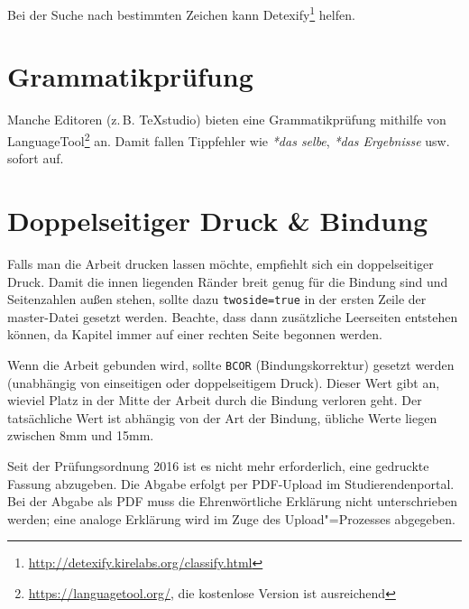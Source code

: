 Bei der Suche nach bestimmten Zeichen kann Detexify\footnote{\url{http://detexify.kirelabs.org/classify.html}} helfen.

\section{Grammatikprüfung}

Manche Editoren (z.\,B. TeXstudio) bieten eine Grammatikprüfung mithilfe von LanguageTool\footnote{\url{https://languagetool.org/}, die kostenlose Version ist ausreichend} an.
Damit fallen Tippfehler wie \emph{*das selbe}, \emph{*das Ergebnisse} usw. sofort auf.

\section{Doppelseitiger Druck \& Bindung}

Falls man die Arbeit drucken lassen möchte, empfiehlt sich ein doppelseitiger Druck.
Damit die innen liegenden Ränder breit genug für die Bindung sind und Seitenzahlen außen stehen, sollte dazu \verb|twoside=true| in der ersten Zeile der master-Datei gesetzt werden. Beachte, dass dann zusätzliche Leerseiten entstehen können, da Kapitel immer auf einer rechten Seite begonnen werden.

Wenn die Arbeit gebunden wird, sollte \verb|BCOR| (Bindungskorrektur) gesetzt werden (unabhängig von einseitigen oder doppelseitigem Druck). Dieser Wert gibt an, wieviel Platz in der Mitte der Arbeit durch die Bindung verloren geht. Der tatsächliche Wert ist abhängig von der Art der Bindung, übliche Werte liegen zwischen 8mm und 15mm.

Seit der Prüfungsordnung 2016 ist es nicht mehr erforderlich, eine gedruckte Fassung abzugeben.
Die Abgabe erfolgt per PDF-Upload im Studierendenportal.
Bei der Abgabe als PDF muss die Ehrenwörtliche Erklärung nicht unterschrieben werden; eine analoge Erklärung wird im Zuge des Upload"=Prozesses abgegeben.
